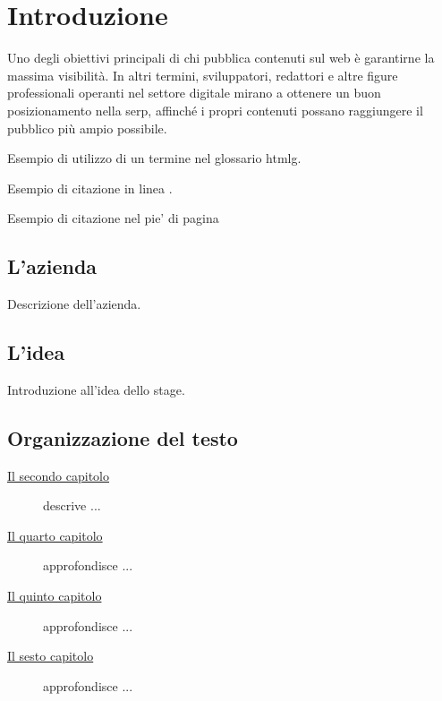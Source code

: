 \chapter{Introduzione}
\label{cap:introduzione}

\par Uno degli obiettivi principali di chi pubblica contenuti sul web è garantirne la massima visibilità. In altri termini, sviluppatori, redattori e altre figure professionali operanti nel settore digitale mirano a ottenere un buon posizionamento nella \gls{serp}, affinché i propri contenuti possano raggiungere il pubblico più ampio possibile.

\par\noindent Esempio di utilizzo di un termine nel glossario
\gls{htmlg}.

\par\noindent Esempio di citazione in linea
\cite{site:semver}.

\par\noindent Esempio di citazione nel pie' di pagina 

\section{L'azienda}

\par Descrizione dell'azienda.

\section{L'idea}

\par Introduzione all'idea dello stage.

\section{Organizzazione del testo}

\begin{description}
    \item[{\hyperref[cap:descrizione-progetto]{Il secondo capitolo}}] descrive ...
    
    
    \item[{\hyperref[cap:analisi-requisiti]{Il quarto capitolo}}] approfondisce ...
    
    \item[{\hyperref[cap:progettazione-codifica]{Il quinto capitolo}}] approfondisce ...
    
    \item[{\hyperref[cap:verifica-validazione]{Il sesto capitolo}}] approfondisce ...
    
\end{description}

